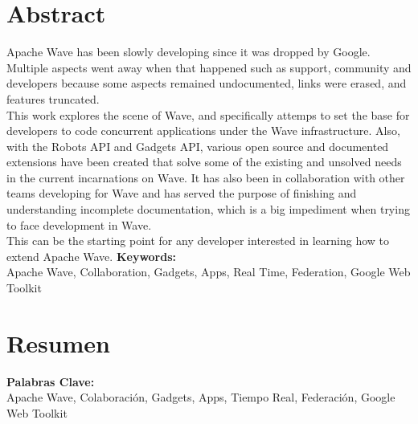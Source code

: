 \newpage
\renewcommand{\thepage}{\Roman{page}}
\setcounter{page}{9}
\chapter*{Abstract}
Apache Wave has been slowly developing since it was dropped by Google. Multiple aspects went away when that happened such as support, community and developers because some aspects remained undocumented, links were erased, and features truncated.\\[.2cm]
This work explores the scene of Wave, and specifically attemps to set the base for developers to code concurrent applications under the Wave infrastructure. Also, with the Robots API and Gadgets API, various open source and documented extensions have been created that solve some of the existing and unsolved needs in the current incarnations on Wave. It has also been in collaboration with other teams developing for Wave and has served the purpose of finishing and understanding incomplete documentation, which is a big impediment when trying to face development in Wave.\\[.2cm]
This can be the starting point for any developer interested in learning how to extend Apache Wave.
\vfill
{\large \bf Keywords:}\\
{\large Apache Wave, Collaboration, Gadgets, Apps, Real Time, Federation, Google Web Toolkit}

\newpage
\renewcommand{\thepage}{\Roman{page}}
\setcounter{page}{10}
\chapter*{Resumen}

\vfill
{\large \bf Palabras Clave:}\\
{\large Apache Wave, Colaboración, Gadgets, Apps, Tiempo Real, Federación, Google Web Toolkit}

\newpage
\thispagestyle{empty}
\mbox{}

